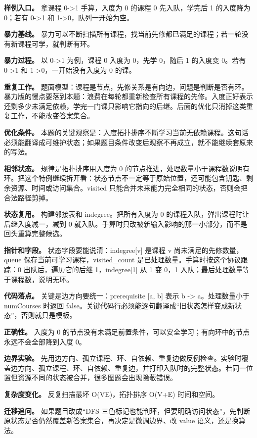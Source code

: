 \textbf{样例入口。} 拿课程 0->1 手算，入度为 0 的课程 0 先入队，学完后 1 的入度降为 0；若有 0->1 和 1->0，队列一开始为空。

\textbf{暴力基线。} 暴力可以不断扫描所有课程，找当前先修都已满足的课程；若一轮没有新课程可学，就判断有环。

\textbf{暴力过程。} 以 0->1 为例，课程 0 入度为 0，先学 0，随后 1 的入度变 0。若有 0->1 和 1->0，一开始没有入度为 0 的课。

\textbf{重复工作。} 题面模型：课程是节点，先修关系是有向边，问题是判断是否有环。暴力版的慢点要落到本题：浪费在每轮都重新检查所有课程的先修。入度正好表示还剩多少未满足依赖，学完一门课只影响它指向的后继。后面的优化只消掉这类重复工作，不能改变答案集合。

\textbf{优化条件。} 本题的关键观察是：入度拓扑排序不断学习当前无依赖课程。这句话必须能翻译成可维护状态；如果题目条件改变后观察不再成立，就不能继续套原来的写法。

\textbf{相邻状态。} 规律是拓扑排序用入度为 0 的节点推进，处理数量小于课程数说明有环。把这个特例继续拆开看：状态节点不一定等于原始位置，还可能包含钥匙、剩余资源、时间或访问集合。visited 只能合并未来能力完全相同的状态，否则会把合法路径剪掉。

\textbf{状态复用。} 构建邻接表和 indegree。把所有入度为 0 的课程入队，弹出课程时让后继入度减一，减到 0 就入队。手算时只改被新输入影响的那一小部分，而不是回头重算完整候选。

\textbf{指针和字段。} 状态字段要能说清：indegree[v] 是课程 v 尚未满足的先修数量，queue 保存当前可学习课程，visited\_count 是已处理数量。手算时按这个协议跟踪：0 出队后，遍历它的后继 1，indegree[1] 从 1 变 0，1 入队；最后处理数量等于课程数，说明无环。

\textbf{代码落点。} 关键是边方向要统一：prerequisite [a, b] 表示 b -> a。处理数量小于 numCourses 时返回 false。关键代码行必须能逐句翻译成“旧状态怎样变成新状态”，否则就只是模板。

\textbf{正确性。} 入度为 0 的节点没有未满足前置条件，可以安全学习；有向环中的节点永远不会全部降到入度 0。

\textbf{边界实验。} 先用边方向、孤立课程、环、自依赖、重复边做反例检查。实验时覆盖边方向、孤立课程、环、自依赖、重复边，并打印入队时的完整状态。若同一位置但资源不同的状态被合并，很多图题会出现隐蔽错误。

\textbf{复杂度变化。} 反复扫描最坏 O(VE)，拓扑排序 O(V+E) 时间和空间。

\textbf{迁移追问。} 如果题目改成“DFS 三色标记也能判环，但要明确访问状态”，先判断原状态是否仍然覆盖新答案集合，再决定是微调边界、改 value 语义，还是换算法。

